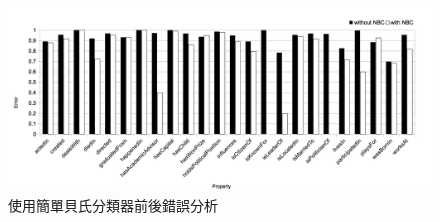 \begin{figure}[h]
    \centering
    \includegraphics[width=\textwidth]{images/04-error}
    \caption{使用簡單貝氏分類器前後錯誤分析}
    \label{i:error}
\end{figure}

